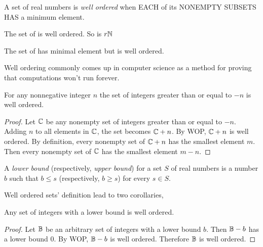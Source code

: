 \begin{definition}
    A set of real numbers is \textit{well ordered} when EACH of its NONEMPTY SUBSETS
    HAS a minimum element.
\end{definition}

\begin{ab}
    The set of  is well ordered. So is $r\mathbb{N}$

    The set of  has minimal element but is 
    well ordered.
\end{ab}

\begin{ab}
    Well ordering commonly comes up in computer science as a method for proving
    that computations won't run forever.
\end{ab}

\begin{claim}
    For any nonnegative integer $n$ the set of integers greater than or
    equal to $-n$ is well ordered.
\end{claim}

\begin{proof}
    Let $\mathbb{C}$ be any nonempty set of integers greater than or equal to $-n$.
    Adding $n$ to all elements in $\mathbb{C}$, the set becomes $\mathbb{C} + n$. By WOP,
    $\mathbb{C} + n$ is well ordered. By definition, every nonempty set of $\mathbb{C} + n$
    has the smallest element $m$. Then every nonempty set of $\mathbb{C}$ has
    the smallest element $m - n$.
\end{proof}

\begin{definition}
    A \textit{lower bound} (respectively, \textit{upper bound}) for a set $S$ of real
    numbers is a number $b$ such that $b \leq s$ (respectively, $b \geq s$) for every $s \in S$.
\end{definition}

Well ordered sets' definition lead to two corollaries,

\begin{cor} \label{corollary2.0.1:ch2}
    Any set of integers with a lower bound is well ordered.
\end{cor}

\begin{proof}
    Let $\mathbb{B}$ be an arbitrary set of integers with a lower bound $b$. Then
    $\mathbb{B} - b$ has a lower bound $0$. By WOP, $\mathbb{B} - b$ is well ordered.
    Therefore $\mathbb{B}$ is well ordered.
\end{proof}

